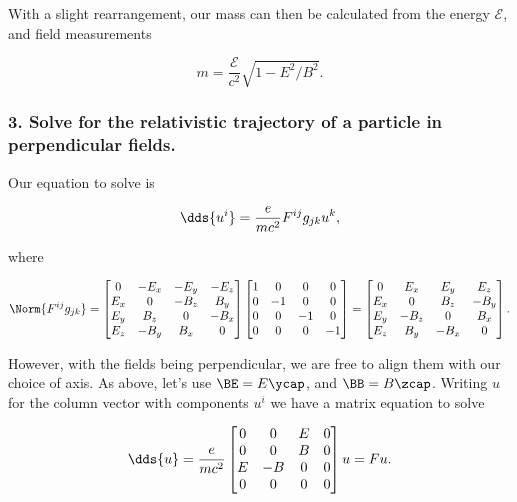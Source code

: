 With a slight rearrangement, our mass can then be calculated from the energy $\mathcal{E}$, and field measurements

\begin{equation}\label{eqn:relElectroDynProblemSet2:470}
m = \frac{ \mathcal{E} }{c^2} \sqrt{ 1 - E^2/B^2 }.
\end{equation}

\subsubsection{3.  Solve for the relativistic trajectory of a particle in perpendicular fields.}

Our equation to solve is

\begin{equation}\label{eqn:relElectroDynProblemSet2:490}
\dds{u^i} = \frac{e}{m c^2} F^{ij} g_{jk} u^k,
\end{equation}

where

\begin{equation}\label{eqn:relElectroDynProblemSet2:510}
\Norm{ F^{ij} g_{jk} } = 
\begin{bmatrix}
0 & -E_x & -E_y & -E_z \\
E_x & 0 & -B_z & B_y \\
E_y & B_z & 0 & -B_x \\
E_z & -B_y & B_x & 0
\end{bmatrix}
\begin{bmatrix}
1 & 0 & 0 & 0 \\
0 & -1 & 0 & 0 \\
0 & 0 & -1 & 0 \\
0 & 0 & 0 & -1 \\
\end{bmatrix}
=
\begin{bmatrix}
0 & E_x & E_y & E_z \\
E_x & 0 & B_z & -B_y \\
E_y & -B_z & 0 & B_x \\
E_z & B_y & -B_x & 0
\end{bmatrix}.
\end{equation}

However, with the fields being perpendicular, we are free to align them with our choice of axis.  As above, let's use $\BE = E \ycap$, and $\BB = B \zcap$.  Writing $u$ for the column vector with components $u^i$ we have a matrix equation to solve

\begin{equation}\label{eqn:relElectroDynProblemSet2:530}
\dds{u} = 
\frac{ e }{m c^2}
\begin{bmatrix}
0 & 0 & E & 0 \\
0 & 0 & B & 0 \\
E & -B & 0 & 0 \\
0 & 0 & 0 & 0
\end{bmatrix} u = F u.
\end{equation}

